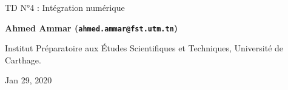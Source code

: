 \documentclass[%
oneside,                 %
final,                   %
10pt,french]{article}
\begin{document}

\newcommand{\exercisesection}[1]{\subsection*{#1}}






\thispagestyle{empty}

\begin{center}
{\LARGE\bf
\begin{spacing}{1.25}
TD N°4 : Intégration numérique
\end{spacing}
}
\end{center}


\begin{center}
{\bf Ahmed Ammar (\texttt{ahmed.ammar@fst.utm.tn})}
\end{center}

    \begin{center}
\centerline{{\small Institut Préparatoire aux Études Scientifiques et Techniques, Université de Carthage.}}
\end{center}
    

\begin{center}
Jan 29, 2020
\end{center}

\vspace{1cm}


\tableofcontents


\vspace{1cm} %



\end{document}
